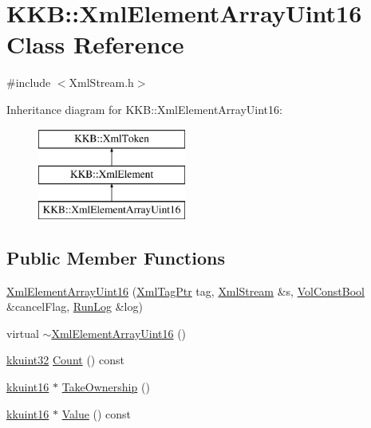 \hypertarget{class_k_k_b_1_1_xml_element_array_uint16}{}\section{K\+KB\+:\+:Xml\+Element\+Array\+Uint16 Class Reference}
\label{class_k_k_b_1_1_xml_element_array_uint16}


{\ttfamily \#include $<$Xml\+Stream.\+h$>$}

Inheritance diagram for K\+KB\+:\+:Xml\+Element\+Array\+Uint16\+:\begin{figure}[H]
\begin{center}
\leavevmode
\includegraphics[height=3.000000cm]{class_k_k_b_1_1_xml_element_array_uint16}
\end{center}
\end{figure}
\subsection*{Public Member Functions}
\begin{DoxyCompactItemize}
\item 
\hyperlink{class_k_k_b_1_1_xml_element_array_uint16_a56551d96ca8dfef01c589d9c6f1fd948}{Xml\+Element\+Array\+Uint16} (\hyperlink{namespace_k_k_b_a9253a3ea8a5da18ca82be4ca2b390ef0}{Xml\+Tag\+Ptr} tag, \hyperlink{class_k_k_b_1_1_xml_stream}{Xml\+Stream} \&s, \hyperlink{namespace_k_k_b_a7d390f568e2831fb76b86b56c87bf92f}{Vol\+Const\+Bool} \&cancel\+Flag, \hyperlink{class_k_k_b_1_1_run_log}{Run\+Log} \&log)
\item 
virtual \hyperlink{class_k_k_b_1_1_xml_element_array_uint16_a224795ab6fc84035d91d1142166040ae}{$\sim$\+Xml\+Element\+Array\+Uint16} ()
\item 
\hyperlink{namespace_k_k_b_af8d832f05c54994a1cce25bd5743e19a}{kkuint32} \hyperlink{class_k_k_b_1_1_xml_element_array_uint16_ab3b670cba977bb683df4a03a7e81a742}{Count} () const 
\item 
\hyperlink{namespace_k_k_b_aa8c7d4d30381c8a0b6fce68974a9c8a9}{kkuint16} $\ast$ \hyperlink{class_k_k_b_1_1_xml_element_array_uint16_adbabe2ccf717f530759b0c6eb2a9aec3}{Take\+Ownership} ()
\item 
\hyperlink{namespace_k_k_b_aa8c7d4d30381c8a0b6fce68974a9c8a9}{kkuint16} $\ast$ \hyperlink{class_k_k_b_1_1_xml_element_array_uint16_aef40485beede42d9055278b0d53976d0}{Value} () const 
\end{DoxyCompactItemize}
